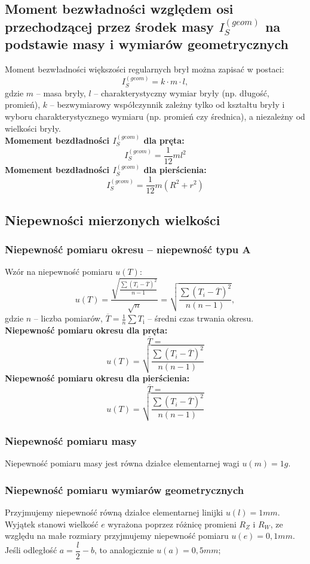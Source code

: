 \documentclass[a4paper,11pt]{article}
\begin{document}
\subsection{Moment bezwładności względem osi przechodzącej przez środek masy $I_{S}^{(geom)}$ na podstawie masy i wymiarów geometrycznych}
Moment bezwładności większości regularnych brył można zapisać w postaci: 
$$I_{S}^{(geom)} = k \cdot m \cdot l,$$ 
gdzie $m$ -- masa bryły, $l$ -- charakterystyczny wymiar bryły (np. długość, promień), $k$ -- bezwymiarowy współczynnik
zależny tylko od kształtu bryły i wyboru charakterystycznego wymiaru (np. promień czy średnica), a niezależny od wielkości bryły.
$$$$
\textbf{Momement bezdładności $I_{S}^{(geom)}$ dla pręta:
}$$I_{S}^{(geom)} = \dfrac{1}{12}ml^{2}$$
\textbf{Momement bezdładności $I_{S}^{(geom)}$ dla pierścienia:
}$$I_{S}^{(geom)} = \dfrac{1}{12}m(R^{2}+r^{2})$$

\subsection{Niepewności mierzonych wielkości}
\subsubsection{Niepewność pomiaru okresu -- niepewność typu A}
Wzór na niepewność pomiaru $u(T)$:
$$u(T)=\displaystyle \frac{\sqrt{\frac{\sum(T_{i}-\overline{T})^{2}}{n-1}}}{\sqrt{n}}=\displaystyle \sqrt{\frac{\sum(T_{i}-\overline{T})^{2}}{n(n-1)}},$$
gdzie $n$ -- liczba pomiarów, $\overline{T}=\frac{1}{n}\sum T_{\mathrm{i}}$ -- średni czas trwania okresu.
$$$$
\textbf{Niepewność pomiaru okresu dla pręta:}
$$\overline{T}=$$ 
$$u(T)=\displaystyle \sqrt{\frac{\sum(T_{i}-\overline{T})^{2}}{n(n-1)}}$$
\textbf{Niepewność pomiaru okresu dla pierścienia:}
$$\overline{T}=$$ 
$$u(T)=\displaystyle \sqrt{\frac{\sum(T_{i}-\overline{T})^{2}}{n(n-1)}}$$
\subsubsection{Niepewność pomiaru masy}
Niepewność pomiaru masy jest równa działce elementarnej wagi $u(m)=1g$.
\subsubsection{Niepewność pomiaru wymiarów geometrycznych}
Przyjmujemy niepewność równą działce elementarnej linijki $u(l)=1mm$. Wyjątek stanowi wielkość $e$ wyrażona poprzez różnicę promieni $R_{Z}$ i $R_{W}$, ze względu na małe rozmiary przyjmujemy niepewność pomiaru $u(e)=0,1mm$. Jeśli odległość $a=\dfrac{l}{2}-b$, to analogicznie $u(a)=0,5mm$;
\end{document}
